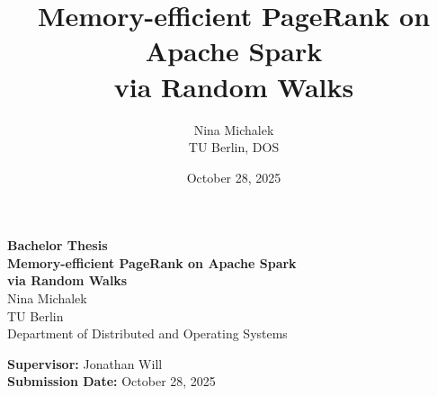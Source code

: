 \documentclass[a4paper,12pt]{article}
\title{Memory-efficient PageRank on Apache Spark\\ via Random Walks}
\author{Nina Michalek \\ TU Berlin, DOS}
\date{October 28, 2025}
\begin{document}
\begin{titlepage}
    \centering
    {\Large \textbf{Bachelor Thesis}}\\[2cm]
    
    {\Huge \bfseries Memory-efficient PageRank on Apache Spark \\ via Random Walks}\\[1.5cm]
    
    {\large Nina Michalek}\\
    {\large TU Berlin \\ Department of Distributed and Operating Systems}\\[1cm]
    
    \vfill
    
    \textbf{Supervisor:} Jonathan Will \\[0.3cm]
    \textbf{Submission Date:} October 28, 2025
\end{titlepage}

\tableofcontents
\newpage









\newpage


\end{document}
